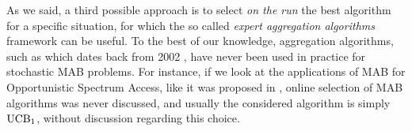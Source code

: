 
As we said, a third possible approach is to select \emph{on the run} the best algorithm for a specific situation, for which the so called \emph{expert aggregation algorithms} framework can be useful.
%
To the best of our knowledge, aggregation algorithms, such as \ExpQ{} which dates back from 2002 \cite{Auer02},
have never been used in practice for stochastic MAB problems.
For instance, if we look at the applications of MAB for Opportunistic Spectrum Access, like it was proposed in \cite{Jouini09,Jouini10,Jouini12},
online selection of MAB algorithms was never discussed,
and usually the considered algorithm is simply $\mathrm{UCB}_1$, without discussion regarding this choice.




